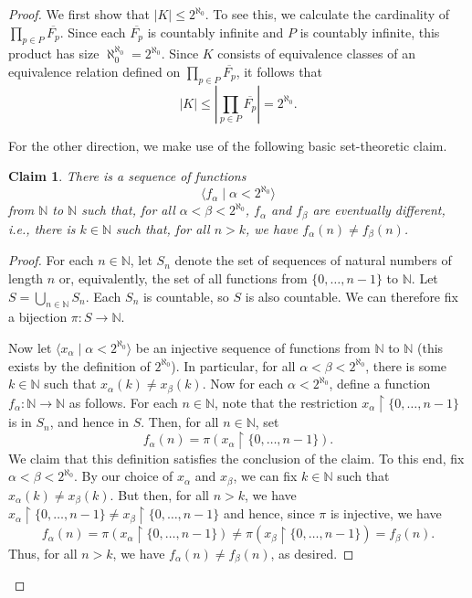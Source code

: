\documentclass[a4paper]{memoir}
\newtheorem{claim}[theorem]{Claim}
\theoremstyle{definition}
\newcommand{\bb}{\mathbb}
\newcommand{\ra}{\rightarrow}
\begin{document}
\begin{proof}
  We first show that $|K| \leq 2^{\aleph_0}$. To see this, we calculate the cardinality 
  of $\prod_{p \in P} \overline{F_p}$. Since each $\overline{F_p}$ is countably infinite 
  and $P$ is countably infinite, this product has size $\aleph_0^{\aleph_0} = 2^{\aleph_0}$.
  Since $K$ consists of equivalence classes of an equivalence relation defined on 
  $\prod_{p \in P} \overline{F_p}$, it follows that 
  \[
    |K| \leq \left| \prod_{p \in P} \overline{F_p} \right| = 2^{\aleph_0}.
  \]
  
  For the other direction, we make use of the following basic set-theoretic claim.
  
  \begin{claim}
    There is a sequence of functions
    \[
      \langle f_\alpha \mid \alpha < 2^{\aleph_0} \rangle
    \]
    from $\bb{N}$ to $\bb{N}$ such that, for all $\alpha < \beta < 2^{\aleph_0}$, $f_\alpha$ and 
    $f_\beta$ are \emph{eventually different}, i.e., there is $k \in \bb{N}$ such that, for 
    all $n > k$, we have $f_\alpha(n) \neq f_\beta(n)$.
  \end{claim}
  
  \begin{proof}
    For each $n \in \bb{N}$, let $S_n$ denote the set of sequences of natural numbers of length 
    $n$ or, equivalently, the set of all functions from $\{0, \ldots, n-1\}$ to $\bb{N}$. 
    Let $S = \bigcup_{n \in \bb{N}} S_n$. Each $S_n$ is countable, so $S$ is also countable. 
    We can therefore fix a bijection $\pi : S \rightarrow \bb{N}$.
    
    Now let $\langle x_\alpha \mid \alpha < 2^{\aleph_0} \rangle$ be an injective sequence of 
    functions from $\bb{N}$ to $\bb{N}$ (this exists by the definition of $2^{\aleph_0}$). 
    In particular, for all $\alpha < \beta < 2^{\aleph_0}$, there is some $k \in \bb{N}$ 
    such that $x_\alpha(k) \neq x_\beta(k)$. Now for each $\alpha < 2^{\aleph_0}$, define 
    a function $f_\alpha : \bb{N} \ra \bb{N}$ as follows. For each $n \in \bb{N}$, note 
    that the restriction $x_\alpha \restriction \{0, \ldots, n-1\}$ is in $S_n$, and hence 
    in $S$. Then, for all $n \in \bb{N}$, set
    \[
      f_\alpha(n) = \pi(x_\alpha \restriction \{0, \ldots, n-1\}).
    \]
    We claim that this definition satisfies the conclusion of the claim. To this end, fix 
    $\alpha < \beta < 2^{\aleph_0}$. By our choice of $x_\alpha$ and $x_\beta$, we can 
    fix $k \in \bb{N}$ such that $x_\alpha(k) \neq x_\beta(k)$. But then, for all 
    $n > k$, we have $x_\alpha \restriction \{0, \ldots, n-1\} \neq 
    x_\beta \restriction \{0, \ldots, n-1\}$ and hence, since $\pi$ is injective, we have
    \[
      f_\alpha(n) = \pi(x_\alpha \restriction \{0, \ldots, n-1\}) \neq 
      \pi(x_\beta \restriction \{0, \ldots, n-1\}) = f_\beta(n).
    \]
    Thus, for all $n > k$, we have $f_\alpha(n) \neq f_\beta(n)$, as desired.
  \end{proof}
  

\end{proof}
\end{document}
